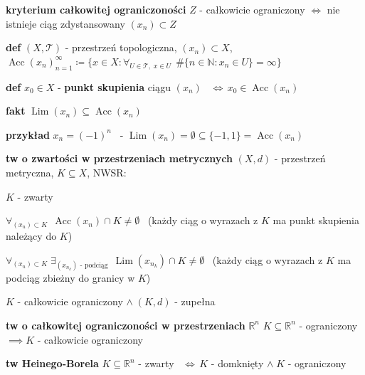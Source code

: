 \documentclass[a4paper,12pt]{article}
\begin{document}
\bigskip
\textbf{kryterium całkowitej ograniczoności} \; \(Z\) - całkowicie ograniczony \(\iff\) nie istnieje ciąg zdystansowany \((x_n) \subset Z\)

\newpage
{}

\bigskip
\textbf{def} \; \((X, \mathcal{T})\) - przestrzeń topologiczna, \; \((x_n) \subset X\), \; \(\operatorname{Acc}(x_n)_{n=1}^{\infty} \coloneqq \{x \in X : \forall_{U \in \mathcal{T}, \; x \in U} \;\, \#\{n \in \mathbb{N} : x_n \in U\} = \infty\}\)

\smallskip
\textbf{def} \; \(x_0 \in X\) - \textbf{punkt skupienia} ciągu \((x_n)\) \, \(\iff \, x_0 \in \operatorname{Acc}(x_n)\)

\smallskip
\textbf{fakt} \; \(\operatorname{Lim}(x_n) \subseteq \operatorname{Acc}(x_n)\)

\bigskip
\begin{logbox}
\textbf{przykład} \; \(x_n = (-1)^n\) \, - \(\operatorname{Lim}(x_n) = \emptyset \subseteq \{-1, 1\} = \operatorname{Acc}(x_n)\)
\end{logbox}

\bigskip
\textbf{tw o zwartości w przestrzeniach metrycznych} \; \((X, d)\) - przestrzeń metryczna, \; \(K \subseteq X\), \; NWSR:
\begin{podpunkty}
    \item \(K\) - zwarty
    \item \(\forall_{(x_n) \subset K} \;\, \operatorname{Acc}(x_n) \cap K \neq \emptyset\) \, (każdy ciąg o wyrazach z $K$ ma punkt skupienia należący do $K$)
    \item \(\forall_{(x_n) \subset K} \; \exists_{(x_{n_k}) \text{ - podciąg}} \;\, \operatorname{Lim}(x_{n_k}) \cap K \neq \emptyset\) \, (każdy ciąg o wyrazach z $K$ ma podciąg zbieżny do granicy w $K$)
    \item \(K\) - całkowicie ograniczony \(\land \; (K, d)\) - zupełna
\end{podpunkty}

\bigskip
\textbf{tw o całkowitej ograniczoności w przestrzeniach} \(\mathbb{R}^n\) \; \(K \subseteq \mathbb{R}^n\) - ograniczony \(\implies K\) - całkowicie ograniczony

\bigskip
\textbf{tw Heinego-Borela} \; \(K \subseteq \mathbb{R}^n\) - zwarty \, \(\iff \, K\) - domknięty \(\land \; K\) - ograniczony


\bigskip
\bigskip
{}

\bigskip
{}
\end{document}
